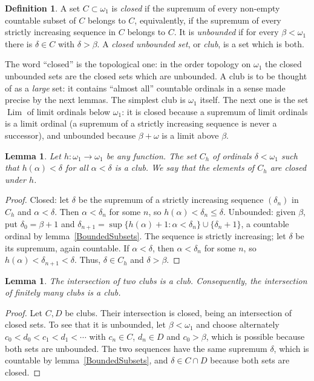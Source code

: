 \documentclass[12pt]{article}
\newtheorem{lemma}[theorem]{Lemma}
\theoremstyle{definition}
\newtheorem{definition}[theorem]{Definition}
\theoremstyle{remark}
\newcommand{\Lim}{\operatorname{Lim}}
\begin{document}
\begin{definition} A set $C\subset\omega_1$ is \emph{closed} if the supremum
    of every non-empty countable subset of $C$ belongs to $C$, equivalently,
    if the supremum of every strictly increasing sequence in $C$ belongs to
    $C$. It is \emph{unbounded} if for every $\beta<\omega_1$ there is
    $\delta\in C$ with $\delta>\beta$. A \emph{closed unbounded set}, or
    \emph{club}, is a set which is both.
\end{definition}

The word ``closed'' is the topological one: in the order topology on
$\omega_1$ the closed unbounded sets are the closed sets which are unbounded.
A club is to be thought of as a \emph{large} set: it contains ``almost all''
countable ordinals in a sense made precise by the next lemmas. The simplest
club is $\omega_1$ itself. The next one is the set $\Lim$ of limit ordinals
below $\omega_1$: it is closed because a supremum of limit ordinals is a
limit ordinal (a supremum of a strictly increasing sequence is never a
successor), and unbounded because $\beta+\omega$ is a limit above $\beta$.

\begin{lemma}\label{ClosurePoints} Let $h:\omega_1\to\omega_1$ be any
    function. The set $C_h$ of ordinals $\delta<\omega_1$ such that
    $h(\alpha)<\delta$ for all $\alpha<\delta$ is a club. We say that the
    elements of $C_h$ are \emph{closed under $h$}.
\end{lemma}
\begin{proof} Closed: let $\delta$ be the supremum of a strictly increasing
    sequence ${(\delta_n)}$ in $C_h$ and $\alpha<\delta$. Then $\alpha<\delta_n$
    for some $n$, so $h(\alpha)<\delta_n\leq\delta$. Unbounded: given $\beta$,
    put $\delta_0=\beta+1$ and
    $\delta_{n+1}=\sup\{h(\alpha)+1:\alpha<\delta_n\}\cup\{\delta_n+1\}$,
    a countable ordinal by lemma~\ref{BoundedSubsets}. The sequence is strictly
    increasing; let $\delta$ be its supremum, again countable. If
    $\alpha<\delta$, then $\alpha<\delta_n$ for some $n$, so
    $h(\alpha)<\delta_{n+1}<\delta$. Thus, $\delta\in C_h$ and $\delta>\beta$.
\end{proof}

\begin{lemma}\label{IntersectionOfClubs} The intersection of two clubs is a
    club. Consequently, the intersection of finitely many clubs is a club.
\end{lemma}
\begin{proof} Let $C,D$ be clubs. Their intersection is closed, being an
    intersection of closed sets. To see that it is unbounded, let
    $\beta<\omega_1$ and choose alternately
    $c_0<d_0<c_1<d_1<\cdots$ with $c_n\in C$, $d_n\in D$ and $c_0>\beta$, which
    is possible because both sets are unbounded. The two sequences have the
    same supremum $\delta$, which is countable by lemma~\ref{BoundedSubsets},
    and $\delta\in C\cap D$ because both sets are closed.
\end{proof}
\end{document}
